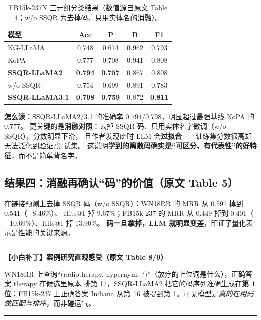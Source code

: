 \documentclass[11pt,UTF8,fontset=fandol]{ctexart}
\newenvironment{tip}[1]{%
  \par\smallskip\noindent\rule{\linewidth}{0.4pt}\par\nobreak
  \noindent\textbf{【小白补丁】#1}\par\nobreak\noindent\ignorespaces
}{%
  \par\noindent\rule{\linewidth}{0.4pt}\par\smallskip
}
\begin{document}
\begin{table}[H]\centering
\caption{FB15k-237N 三元组分类结果（数值源自原文 Table 4；w/o SSQR 为去掉码、只用实体名的消融）。}
\begin{tabular}{lcccc}
\toprule
模型 & Acc & P & R & F1 \\
\midrule
KG-LLaMA      & 0.748 & 0.674 & 0.962 & 0.793 \\
KoPA          & 0.777 & 0.708 & 0.941 & 0.808 \\
\textbf{SSQR-LLaMA2}   & \textbf{0.794} & \textbf{0.757} & 0.867 & 0.808 \\
\quad w/o SSQR         & 0.754 & 0.699 & 0.891 & 0.783 \\
\textbf{SSQR-LLaMA3.1} & \textbf{0.798} & \textbf{0.759} & 0.872 & \textbf{0.811} \\
\bottomrule
\end{tabular}
\end{table}

\textbf{怎么读}：SSQR-LLaMA2/3.1 的准确率 0.794/0.798，明显超过最强基线 KoPA 的 0.777。
更关键的是\textbf{消融对照}：去掉 SSQR 码、只用实体名字微调（w/o SSQR），分数明显下滑，
且作者发现此时 LLM 会\textbf{过拟合}——训练集分数很高却无法泛化到验证/测试集。
这说明\textbf{学到的离散码确实是“可区分、有代表性”的好特征}，而不是简单背名字。

\subsection{结果四：消融再确认“码”的价值（原文 Table 5）}
在链接预测上去掉 SSQR 码（w/o SSQR）：WN18RR 的 MRR 从 0.591 掉到 0.541（$-8.46\%$）、
Hits@1 掉 9.67\%；FB15k-237 的 MRR 从 0.449 掉到 0.401（$-10.69\%$）、Hits@1 掉 13.90\%。
\textbf{码一旦拿掉，LLM 就明显变差}，印证了量化表示是性能的关键来源。

\begin{tip}{案例研究直观感受（原文 Table 8/9）}
WN18RR 上查询“(radiotherapy, hypernym, ?)”（放疗的上位词是什么），正确答案 therapy 在候选里原本
排第 17，SSQR-LLaMA2 把它的码序列准确生成在\textbf{第 1 位}；FB15k-237 上正确答案 Indiana 从第 16
被提到第 1。可见模型是\emph{真的在用码做匹配与排序}，而非碰运气。
\end{tip}
\end{document}
